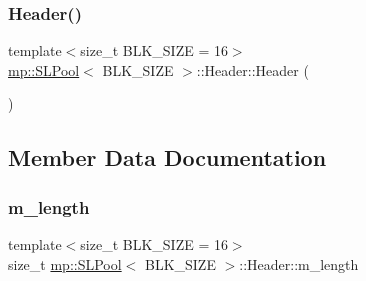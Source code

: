 \subsubsection{\texorpdfstring{Header()}{Header()}}
{\footnotesize\ttfamily template$<$size\+\_\+t B\+L\+K\+\_\+\+S\+I\+ZE = 16$>$ \\
\hyperlink{classmp_1_1_s_l_pool}{mp\+::\+S\+L\+Pool}$<$ B\+L\+K\+\_\+\+S\+I\+ZE $>$\+::Header\+::\+Header (\begin{DoxyParamCaption}{ }\end{DoxyParamCaption})\hspace{0.3cm}{\ttfamily [inline]}}



\subsection{Member Data Documentation}
\mbox{\label{structmp_1_1_s_l_pool_1_1_header_a4ce73cd63134fdeb85adab3c35b744c0}} 
\subsubsection{\texorpdfstring{m\+\_\+length}{m\_length}}
{\footnotesize\ttfamily template$<$size\+\_\+t B\+L\+K\+\_\+\+S\+I\+ZE = 16$>$ \\
size\+\_\+t \hyperlink{classmp_1_1_s_l_pool}{mp\+::\+S\+L\+Pool}$<$ B\+L\+K\+\_\+\+S\+I\+ZE $>$\+::Header\+::m\+\_\+length}

